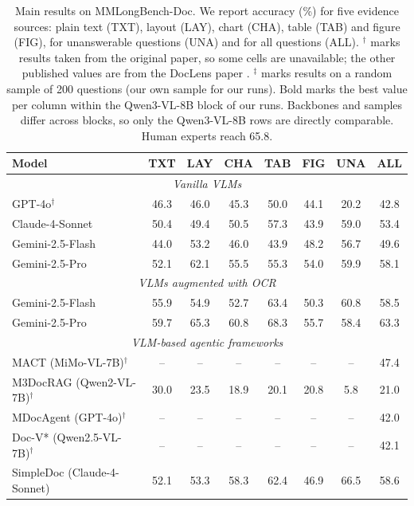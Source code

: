\documentclass[pdflatex,sn-basic]{sn-jnl}%
\theoremstyle{thmstyletwo}%
\begin{document}
\begin{table}[t]
\caption{Main results on MMLongBench-Doc. We report accuracy (\%) for five evidence sources: plain text (TXT), layout (LAY), chart (CHA), table (TAB) and figure (FIG), for unanswerable questions (UNA) and for all questions (ALL). $^\dagger$ marks results taken from the original paper, so some cells are unavailable; the other published values are from the DocLens paper \cite{zhu2025doclens}. $^\ddagger$ marks results on a random sample of 200 questions (our own sample for our runs). Bold marks the best value per column within the Qwen3-VL-8B block of our runs. Backbones and samples differ across blocks, so only the Qwen3-VL-8B rows are directly comparable. Human experts reach 65.8.}
\label{tab:main}
\centering
\footnotesize
\setlength{\tabcolsep}{4.5pt}
\begin{tabular}{@{}lccccccc@{}}
\toprule
Model & TXT & LAY & CHA & TAB & FIG & UNA & ALL \\
\midrule
\multicolumn{8}{c}{\textit{Vanilla VLMs}} \\
GPT-4o$^\dagger$ \cite{ma2024mmlongbench} & 46.3 & 46.0 & 45.3 & 50.0 & 44.1 & 20.2 & 42.8 \\
Claude-4-Sonnet & 50.4 & 49.4 & 50.5 & 57.3 & 43.9 & 59.0 & 53.4 \\
Gemini-2.5-Flash \cite{comanici2025gemini} & 44.0 & 53.2 & 46.0 & 43.9 & 48.2 & 56.7 & 49.6 \\
Gemini-2.5-Pro \cite{comanici2025gemini} & 52.1 & 62.1 & 55.5 & 55.3 & 54.0 & 59.9 & 58.1 \\
\midrule
\multicolumn{8}{c}{\textit{VLMs augmented with OCR}} \\
Gemini-2.5-Flash & 55.9 & 54.9 & 52.7 & 63.4 & 50.3 & 60.8 & 58.5 \\
Gemini-2.5-Pro & 59.7 & 65.3 & 60.8 & 68.3 & 55.7 & 58.4 & 63.3 \\
\midrule
\multicolumn{8}{c}{\textit{VLM-based agentic frameworks}} \\
MACT (MiMo-VL-7B)$^\dagger$ \cite{yu2025mact} & -- & -- & -- & -- & -- & -- & 47.4 \\
M3DocRAG (Qwen2-VL-7B)$^\dagger$ \cite{cho2024m3docrag} & 30.0 & 23.5 & 18.9 & 20.1 & 20.8 & 5.8 & 21.0 \\
MDocAgent (GPT-4o)$^\dagger$ \cite{han2025mdocagent} & -- & -- & -- & -- & -- & -- & 42.0 \\
Doc-V* (Qwen2.5-VL-7B)$^\dagger$ \cite{docvstar} & -- & -- & -- & -- & -- & -- & 42.1 \\
SimpleDoc (Claude-4-Sonnet) \cite{jain2025simpledoc} & 52.1 & 53.3 & 58.3 & 62.4 & 46.9 & 66.5 & 58.6 \\

\end{tabular}
\end{table}
\end{document}
